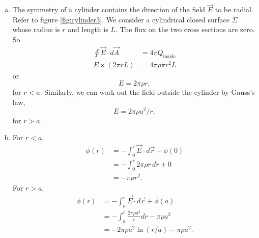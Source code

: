 \documentclass{esg8022pset}
\begin{document}
\begin{solution}
  \begin{enumerate}[(a)]
    \item The symmetry of a cylinder contains the direction of the field
      $\vec{E}$ to be radial.  Refer to figure \ref{fig:cylinder3}.  We
      consider a cylindrical closed surface $\Sigma$ whose radius is $r$ and
      length is $L$.  The flux on the two cross sections are zero.  So
      \begin{align*}
        \oint \vec{E}\cdot d\vec{A} & = 4\pi Q_{\text{inside}}\\
        E\times(2\pi rL) & = 4\pi\rho\pi r^2L
      \end{align*}
      or
      \begin{equation*}
      E=2\pi\rho r,
      \end{equation*}
      for $r<a$.  Similarly, we can work out the field outside the cylinder
      by Gauss's law,
      \begin{equation*}
      E=2\pi\rho a^2/r,
      \end{equation*}
      for $r>a$.
    \item For $r<a$, 
      \begin{align*}
        \phi(r) & = -\int_0^r\vec{E}\cdot d\vec{r}+\phi(0)\\
                & = -\int_0^r 2\pi\rho r\,dr+0\\
                & = -\pi\rho r^2.
      \end{align*}
      For $r>a$,
      \begin{align*}
        \phi(r) & = -\int_a^r \vec{E}\cdot d\vec{r}+\phi(a)\\
                & = -\int_a^r\frac{2\pi\rho a^2}{r}dr-\pi\rho a^2\\
                & = -2\pi\rho a^2\ln{(r/a)}-\pi\rho a^2.
      \end{align*}
  \end{enumerate}
\end{solution}
\end{document}
